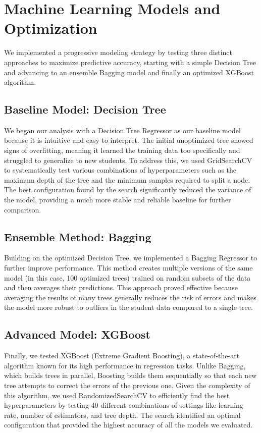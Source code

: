 \documentclass[a4paper,12pt]{article}
\begin{document}
\section{Machine Learning Models and Optimization}
We implemented a progressive modeling strategy by testing three distinct approaches to maximize predictive accuracy, starting with a simple Decision Tree and advancing to an ensemble Bagging model and finally an optimized XGBoost algorithm.

\subsection{Baseline Model: Decision Tree}
We began our analysis with a Decision Tree Regressor as our baseline model because it is intuitive and easy to interpret. The initial unoptimized tree showed signs of overfitting, meaning it learned the training data too specifically and struggled to generalize to new students. To address this, we used GridSearchCV to systematically test various combinations of hyperparameters such as the maximum depth of the tree and the minimum samples required to split a node. The best configuration found by the search significantly reduced the variance of the model, providing a much more stable and reliable baseline for further comparison.

\subsection{Ensemble Method: Bagging}
Building on the optimized Decision Tree, we implemented a Bagging Regressor to further improve performance. This method creates multiple versions of the same model (in this case, 100 optimized trees) trained on random subsets of the data and then averages their predictions. This approach proved effective because averaging the results of many trees generally reduces the risk of errors and makes the model more robust to outliers in the student data compared to a single tree.

\subsection{Advanced Model: XGBoost}
Finally, we tested XGBoost (Extreme Gradient Boosting), a state-of-the-art algorithm known for its high performance in regression tasks. Unlike Bagging, which builds trees in parallel, Boosting builds them sequentially so that each new tree attempts to correct the errors of the previous one. Given the complexity of this algorithm, we used RandomizedSearchCV to efficiently find the best hyperparameters by testing 40 different combinations of settings like learning rate, number of estimators, and tree depth. The search identified an optimal configuration that provided the highest accuracy of all the models we evaluated.
\end{document}
